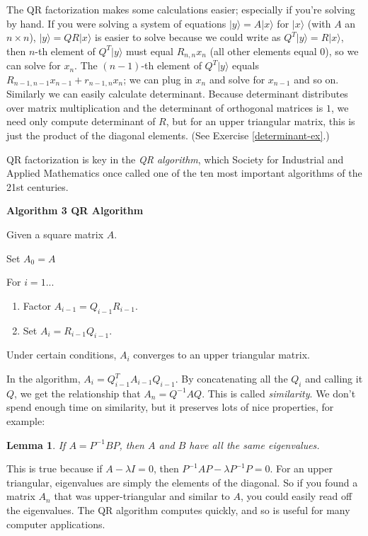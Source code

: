 \documentclass{amsbook}
\newtheorem{lemma}[theorem]{Lemma}
\begin{document}
The QR factorization makes some calculations easier; especially if you're solving by hand.  If you were solving a system of equations $|y\rangle=A|x\rangle$ for $|x\rangle$ (with $A$ an $n\times n$), $|y\rangle=QR|x\rangle$ is easier to solve because we could write as $Q^T|y\rangle=R|x\rangle$, then $n$-th element of $Q^T|y\rangle$ must equal $R_{n,n}x_n$ (all other elements equal $0$), so we can solve for $x_n$.  The $(n-1)$-th element of $Q^T|y\rangle$ equals $R_{n-1,n-1}x_{n-1}+r_{n-1,n}x_n$; we can plug in $x_n$ and solve for $x_{n-1}$ and so on.  Similarly we can easily calculate determinant.  Because determinant distributes over matrix multiplication and the determinant of orthogonal matrices is $1$, we need only compute determinant of $R$, but for an upper triangular matrix, this is just the product of the diagonal elements.  (See Exercise \ref{determinant-ex}.)

QR factorization is key in the {\em QR algorithm}, which Society for Industrial and Applied Mathematics once called one of the ten most important algorithms of the 21st centuries.

\begin{tcolorbox}[title=Algorithm 3: QR Algorithm,colback=blue!5]
  {\bfseries\Large Algorithm 3 QR Algorithm}\label{Algorithm1}

Given a square matrix $A$.

Set $A_0=A$

For $i=1...$
\begin{enumerate}
  \item Factor $A_{i-1}=Q_{i-1}R_{i-1}$.
  \item Set $A_i=R_{i-1}Q_{i-1}$.
\end{enumerate}

Under certain conditions, $A_i$ converges to an upper triangular matrix.
\end{tcolorbox}

In the algorithm, $A_i=Q_{i-1}^TA_{i-1}Q_{i-1}$.  By concatenating all the $Q_i$ and calling it $Q$, we get the relationship that $A_n=Q^{-1}AQ$.  This is called {\em similarity}.  We don't spend enough time on similarity, but it preserves lots of nice properties, for example:

\begin{lemma}
If $A=P^{-1}BP$, then $A$ and $B$ have all the same eigenvalues.
\end{lemma}

This is true because if $A-\lambda I=0$, then $P^{-1}AP-\lambda P^{-1}P=0$.  For an upper triangular, eigenvalues are simply the elements of the diagonal.  So if you found a matrix $A_n$ that was upper-triangular and similar to $A$, you could easily read off the eigenvalues.  The QR algorithm computes quickly, and so is useful for many computer applications.
\end{document}
